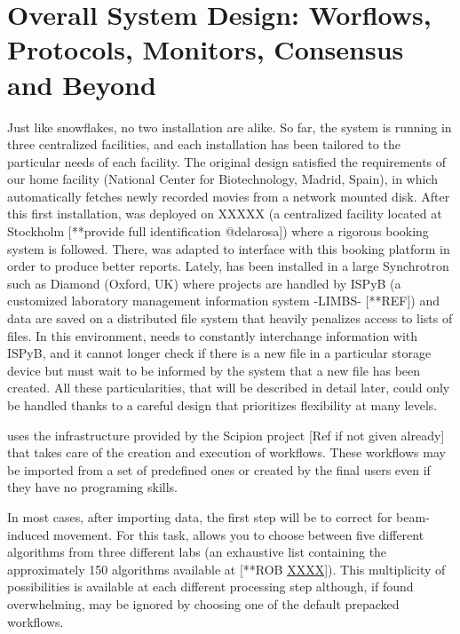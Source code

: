 \section{Overall System Design: Worflows, Protocols, Monitors, Consensus and Beyond}
\label{overall}
Just like snowflakes, no two \scipionbox installation are alike. So far, the system is running in 
three centralized facilities, and each installation has been tailored to the particular needs of each facility. The original design satisfied the requirements of our home facility (National Center for Biotechnology, Madrid, Spain), in which \scipionbox automatically fetches newly recorded movies from a network mounted disk. After this first installation, \scipionbox was deployed on XXXXX (a centralized facility located at Stockholm [**provide full identification @delarosa]) where a rigorous booking system is followed. There, \scipionbox was adapted to interface with this booking platform in order to produce better reports. Lately,  \scipionbox has been installed in a large Synchrotron  such as Diamond (Oxford, UK) where projects are handled by ISPyB (a customized laboratory management information system -LIMBS- [**REF]) and data are saved on a distributed file system that heavily penalizes access to lists of files. In this environment, \scipionbox needs to constantly interchange information with ISPyB, and it cannot longer check if there is a new file in a particular storage device but must wait to be informed by the system that a new file has been created. All these particularities, that will be described in detail later, could only be handled thanks to a careful design that prioritizes flexibility at many levels. 

\scipionbox uses the infrastructure provided by the Scipion project [Ref if not given already]
that takes care of the creation and execution of workflows. These workflows may be imported from a set of predefined ones or created by the final users even if they have no programing skills.

In most cases, after importing data, the first step will be to correct for beam-induced movement. For this task, \scipionbox allows you to choose between five different algorithms from three different labs (an exhaustive list containing the approximately 150 algorithms available at [**ROB \url{XXXX}]). This multiplicity of possibilities is available at each different processing step although, if found overwhelming, may be ignored by choosing one of the default prepacked workflows.   

